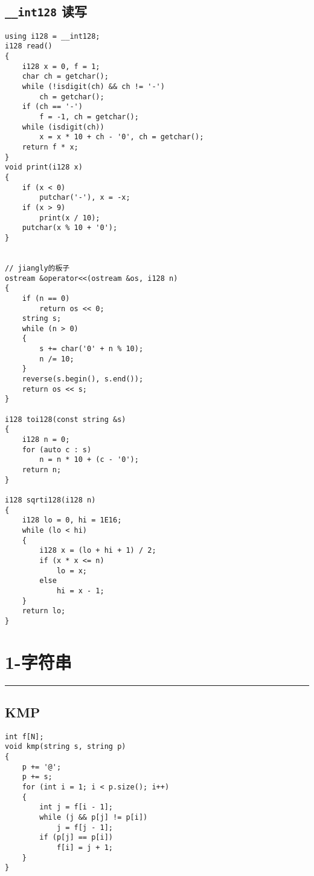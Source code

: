 \documentclass[]{article}
\begin{document}
\hypertarget{int128-ux8bfbux5199}{%
\subsection{\texorpdfstring{\texttt{\_\_int128}
读写}{\_\_int128 读写}}\label{int128-ux8bfbux5199}}

\begin{verbatim}
using i128 = __int128;
i128 read()
{
    i128 x = 0, f = 1;
    char ch = getchar();
    while (!isdigit(ch) && ch != '-')
        ch = getchar();
    if (ch == '-')
        f = -1, ch = getchar();
    while (isdigit(ch))
        x = x * 10 + ch - '0', ch = getchar();
    return f * x;
}
void print(i128 x)
{
    if (x < 0)
        putchar('-'), x = -x;
    if (x > 9)
        print(x / 10);
    putchar(x % 10 + '0');
}


// jiangly的板子
ostream &operator<<(ostream &os, i128 n)
{
    if (n == 0)
        return os << 0;
    string s;
    while (n > 0)
    {
        s += char('0' + n % 10);
        n /= 10;
    }
    reverse(s.begin(), s.end());
    return os << s;
}

i128 toi128(const string &s)
{
    i128 n = 0;
    for (auto c : s)
        n = n * 10 + (c - '0');
    return n;
}

i128 sqrti128(i128 n)
{
    i128 lo = 0, hi = 1E16;
    while (lo < hi)
    {
        i128 x = (lo + hi + 1) / 2;
        if (x * x <= n)
            lo = x;
        else
            hi = x - 1;
    }
    return lo;
}
\end{verbatim}

\hypertarget{ux5b57ux7b26ux4e32}{%
\section{1-字符串}\label{ux5b57ux7b26ux4e32}}

\begin{center}\rule{0.5\linewidth}{0.5pt}\end{center}

\hypertarget{kmp}{%
\subsection{KMP}\label{kmp}}

\begin{verbatim}
int f[N];
void kmp(string s, string p)
{
    p += '@';
    p += s;
    for (int i = 1; i < p.size(); i++)
    {
        int j = f[i - 1];
        while (j && p[j] != p[i])
            j = f[j - 1];
        if (p[j] == p[i])
            f[i] = j + 1;
    }
}
\end{verbatim}
\end{document}
